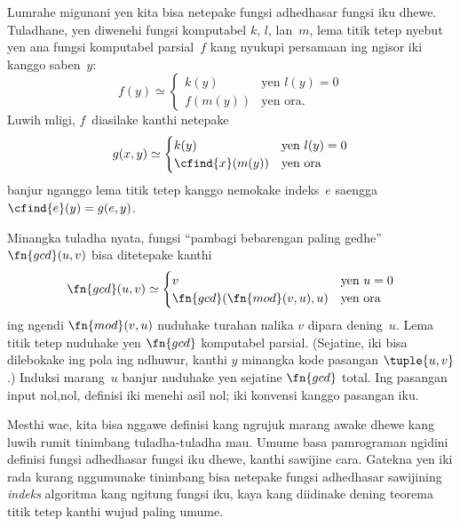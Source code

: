 \documentclass[../../../include/open-logic-section]{subfiles}
\begin{document}

Lumrahe migunani yen kita bisa netepake fungsi
adhedhasar fungsi iku dhewe. Tuladhane, yen diwenehi
fungsi komputabel $k$, $l$, lan~$m$, lema titik tetep
nyebut yen ana fungsi komputabel parsial~$f$
kang nyukupi persamaan ing ngisor iki kanggo saben~$y$:
\[
f(y) \simeq
\begin{cases}
k(y) & \text{yen $l(y) = 0$} \\
f(m(y)) & \text{yen ora.}
\end{cases}
\]
Luwih mligi, $f$~diasilake kanthi netepake
\[
g(x,y) \simeq
\begin{cases}
k(y) & \text{yen $l(y) = 0$} \\
\cfind{x}(m(y)) & \text{yen ora}
\end{cases}
\]
banjur nganggo lema titik tetep kanggo
nemokake indeks~$e$ saengga
$\cfind{e}(y) = g(e,y)$.

Minangka tuladha nyata, fungsi
``pambagi bebarengan paling gedhe''
$\fn{gcd}(u,v)$ bisa ditetepake kanthi
\[
\fn{gcd}(u,v) \simeq
\begin{cases}
v & \text{yen $u = 0$} \\
\fn{gcd}(\fn{mod}(v, u), u) & \text{yen ora}
\end{cases}
\]
ing ngendi $\fn{mod}(v, u)$ nuduhake turahan
nalika $v$ dipara dening~$u$. Lema titik
tetep nuduhake yen $\fn{gcd}$ komputabel parsial.
(Sejatine, iki bisa dilebokake ing pola ing
ndhuwur, kanthi $y$ minangka kode pasangan
$\tuple{u, v}$.) Induksi marang~$u$
banjur nuduhake yen sejatine $\fn{gcd}$ total. Ing pasangan input nol,nol, definisi iki menehi asil nol; iki konvensi kanggo pasangan iku.

Mesthi wae, kita bisa nggawe definisi kang
ngrujuk marang awake dhewe kang luwih
rumit tinimbang tuladha-tuladha mau.
Umume basa pamrograman ngidini definisi
fungsi adhedhasar fungsi iku dhewe,
kanthi sawijine cara. Gatekna yen iki
rada kurang nggumunake tinimbang bisa
netepake fungsi adhedhasar sawijining
\emph{indeks} algoritma kang ngitung fungsi
iku, kaya kang diidinake dening teorema
titik tetep kanthi wujud paling umume.
\end{document}
